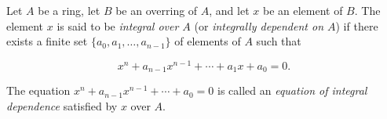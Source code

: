 Let $A$ be a ring, let $B$ be an overring of $A$, and let $x$ be an element of $B$. The element $x$ is said to be \emph{integral over $A$} (or \emph{integrally dependent on $A$}) if there exists a finite set $\{a_0, a_1, \dots, a_{n-1}\}$ of elements of $A$ such that

$$x^n + a_{n-1}x^{n-1} + \cdots + a_1 x + a_0 = 0.$$

The equation $x^n + a_{n-1}x^{n-1} + \cdots + a_0 = 0$ is called an \emph{equation of integral dependence} satisfied by $x$ over $A$.
